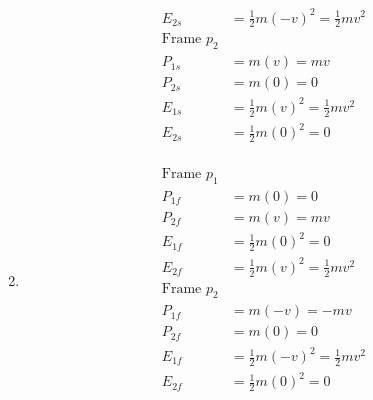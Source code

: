 \documentclass[11pt,letterpaper, twocolumn]{article}
\begin{document}
\begin{enumerate}[label=(\alph*)]
\begin{align*}
        E_{2s} &= \frac{1}{2}m(-v)^2 = \frac{1}{2}mv^2\\
        \text{Frame } p_2\\
        P_{1s} &= m(v) = mv\\
        P_{2s} &= m(0) = 0\\
        E_{1s} &= \frac{1}{2}m(v)^2 = \frac{1}{2}mv^2\\
        E_{2s} &= \frac{1}{2}m(0)^2 = 0\\
    \end{align*}
    \item \begin{align*}
        \text{Frame } p_1\\
        P_{1f} &= m(0) = 0\\
        P_{2f} &= m(v) = mv\\
        E_{1f} &= \frac{1}{2}m(0)^2 = 0\\
        E_{2f} &= \frac{1}{2}m(v)^2 = \frac{1}{2}mv^2\\
        \text{Frame } p_2\\
        P_{1f} &= m(-v) = -mv\\
        P_{2f} &= m(0) = 0\\
        E_{1f} &= \frac{1}{2}m(-v)^2 = \frac{1}{2}mv^2\\
        E_{2f} &= \frac{1}{2}m(0)^2 = 0\\
    \end{align*}
\end{enumerate}
\end{document}
